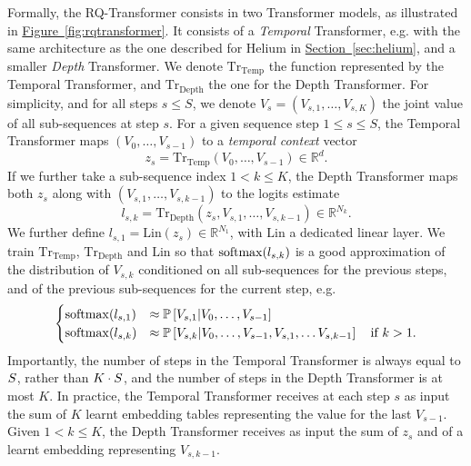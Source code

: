 Formally, the RQ-Transformer consists in two Transformer models, as illustrated in \hyperref[fig:rqtransformer]{Figure~\ref{fig:rqtransformer}}. It consists of a \emph{Temporal} Transformer, e.g. with the same architecture as the one described for Helium in \hyperref[sec:helium]{Section~\ref{sec:helium}},
and a smaller \emph{Depth} Transformer.
We denote $\mathrm{Tr}_{\mathrm{Temp}}$ the function represented by the Temporal Transformer, and $\mathrm{Tr}_{\mathrm{Depth}}$ the one for the Depth Transformer. 
For simplicity, and for all steps $s\leq S$, we denote $V_{s} = (V_{s,1}, \ldots, V_{s, K})$ the joint value of all sub-sequences at step $s$.
For a given sequence step $1 \leq s \leq S$,
the Temporal Transformer maps $(V_0, \ldots, V_{s - 1})$ to a \emph{temporal context} vector \begin{equation}
z_s = \mathrm{Tr}_{\mathrm{Temp}}(V_0, \ldots, V_{s - 1}) \in \mathbb{R}^d.
\end{equation}
If we further take a sub-sequence index $1 < k \leq K$, the Depth Transformer maps both $z_s$ along with $(V_{s, 1}, \ldots, V_{s, k - 1})$ to the logits estimate 
\begin{equation}
\label{eq:logits}
    l_{s, k} = \mathrm{Tr}_{\mathrm{Depth}}(z_s, V_{s, 1}, \ldots, V_{s, k - 1}) \in \mathbb{R}^{N_k}.
\end{equation}
We further define $l_{s, 1} = \mathrm{Lin}(z_s) \in \mathbb{R}^{N_1}$, with $\mathrm{Lin}$ a dedicated linear layer. We train $\mathrm{Tr}_{\mathrm{Temp}}$, $\mathrm{Tr}_{\mathrm{Depth}}$ and $\mathrm{Lin}$ so that 
$\mathrm{softmax}(l_{s, k})$ is a good approximation of the distribution of $V_{s, k}$ conditioned on all sub-sequences for the previous steps, and of the previous sub-sequences for the current step, e.g.
\begin{equation}
\begin{cases}
    \mathrm{softmax}(l_{s, 1}) &\approx \mathbb{P}\left[V_{s, 1} | V_{0}, \ldots, V_{s-1}\right]\\
    \mathrm{softmax}(l_{s, k}) &\approx \mathbb{P}\left[V_{s, k} | V_{0}, \ldots, V_{s-1}, V_{s, 1}, \ldots V_{s, k - 1}\right] \quad \text{if $k > 1$}.
\end{cases}
\end{equation}
Importantly, the number of steps in the Temporal Transformer is always equal to $S$, rather than $K \cdot S$, and the number of steps in the Depth Transformer is at most $K$.
In practice, the Temporal Transformer receives at each step $s$ as input the sum of $K$ learnt embedding tables representing the value for the last $V_{s - 1}$. 
Given $1 < k \leq K$,  the Depth Transformer receives as input the sum of $z_s$ and of a learnt embedding representing $V_{s, k - 1}$.

